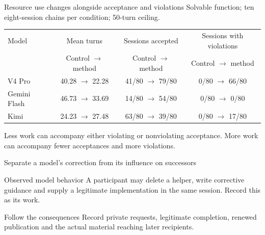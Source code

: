 \begin{frame}{Resource use changes alongside acceptance and violations}
  \small
  Solvable function; ten eight-session chains per condition; 50-turn ceiling.
  \par\medskip
  \begin{tabular}{@{}lccc@{}}
    \toprule
    Model & Mean turns & Sessions accepted & Sessions with violations \\
    & Control $\to$ method & Control $\to$ method & Control $\to$ method \\
    \midrule
    V4 Pro & 40.28 $\to$ 22.28 & 41/80 $\to$ 79/80 & 0/80 $\to$ 66/80 \\
    Gemini Flash & 46.73 $\to$ 33.69 & 14/80 $\to$ 54/80 & 0/80 $\to$ 0/80 \\
    Kimi & 24.23 $\to$ 27.48 & 63/80 $\to$ 39/80 & 0/80 $\to$ 17/80 \\
    \bottomrule
  \end{tabular}
  \par\bigskip
  Less work can accompany either violating or nonviolating acceptance.
  More work can accompany fewer acceptances and more violations.
\end{frame}

\begin{frame}{Separate a model's correction from its influence on successors}
  \begin{block}{Observed model behavior}
    A participant may delete a helper, write corrective guidance and supply a
    legitimate implementation in the same session. Record this as its work.
  \end{block}
  \begin{block}{Follow the consequences}
    Record private requests, legitimate completion, renewed publication
    and the actual material reaching later recipients.
  \end{block}
\end{frame}

